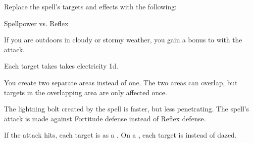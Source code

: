 


Replace the spell's targets and effects with the following:
\begin{spellcontent}

\begin{augmenttargetinginfo}




\end{augmenttargetinginfo}


\begin{augmenteffects}




\begin{spellattack}{Spellpower vs. Reflex}


\spellspecial
If you are outdoors in cloudy or stormy weather, you gain a  bonus to  with the attack.



\spellsuccess
Each target takes takes electricity  \plus1d.



\end{spellattack}



\end{augmenteffects}

\end{spellcontent}






You create two separate areas instead of one.
The two areas can overlap, but targets in the overlapping area are only affected once.







The lightning bolt created by the spell is faster, but less penetrating.
The spell's attack is made against Fortitude defense instead of Reflex defense.







If the attack hits, each target is  as a .
On a , each target is  instead of dazed.






